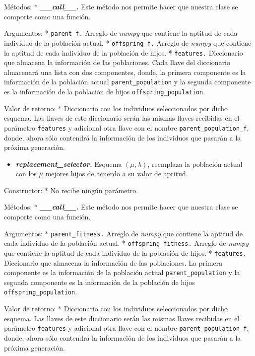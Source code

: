 \documentclass[11pt]{article}
\providecommand{\tightlist}{%
      \setlength{\itemsep}{0pt}\setlength{\parskip}{0pt}}
\begin{document}
Métodos: * \emph{\textbf{\_\_call\_\_.}} Este método nos permite hacer
que nuestra clase se comporte como una función.

Argumentos: * \texttt{parent\_f.} Arreglo de \emph{numpy} que contiene
la aptitud de cada individuo de la población actual. *
\texttt{offspring\_f.} Arreglo de \emph{numpy} que contiene la aptitud
de cada individuo de la población de hijos. * \texttt{features.}
Diccionario que almacena la información de las poblaciones. Cada llave
del diccionario almacenará una lista con dos componentes, donde, la
primera componente es la información de la población actual
\texttt{parent\_population} y la segunda componente es la información de
la población de hijos \texttt{offspring\_population}.

Valor de retorno: * Diccionario con los individuos seleccionados por
dicho esquema. Las llaves de este diccionario serán las mismas llaves
recibidas en el parámetro \texttt{features} y adicional otra llave con
el nombre \texttt{parent\_population\_f}, donde, ahora sólo contendrá la
información de los individuos que pasarán a la próxima generación.

    \begin{itemize}
\tightlist
\item
  \emph{\textbf{replacement\_selector.}} Esquema \((\mu, \lambda)\),
  reemplaza la población actual con los \(\mu\) mejores hijos de acuerdo
  a su valor de aptitud.
\end{itemize}

Constructor: * No recibe ningún parámetro.

Métodos: * \emph{\textbf{\_\_call\_\_.}} Este método nos permite hacer
que nuestra clase se comporte como una función.

Argumentos: * \texttt{parent\_fitness.} Arreglo de \emph{numpy} que
contiene la aptitud de cada individuo de la población actual. *
\texttt{offspring\_fitness.} Arreglo de \emph{numpy} que contiene la
aptitud de cada individuo de la población de hijos. * \texttt{features.}
Diccionario que almacena la información de las poblaciones. La primera
componente es la información de la población actual
\texttt{parent\_population} y la segunda componente es la información de
la población de hijos \texttt{offspring\_population}.

Valor de retorno: * Diccionario con los individuos seleccionados por
dicho esquema. Las llaves de este diccionario serán las mismas llaves
recibidas en el parámetro \texttt{features} y adicional otra llave con
el nombre \texttt{parent\_population\_f}, donde, ahora sólo contendrá la
información de los individuos que pasarán a la próxima generación.
\end{document}
